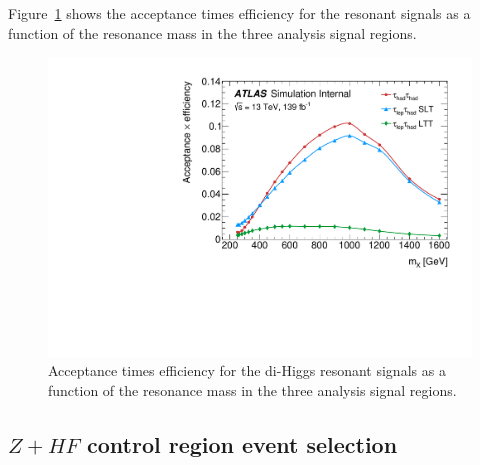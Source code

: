 Figure~\ref{fig:DiHiggsResSignalAcceptance} shows the acceptance times efficiency for the resonant signals as a function of the resonance mass in the three analysis signal regions.

\begin{figure}
\centering
\includegraphics[width=.75\textwidth]{figures/selection/AcceptanceEfficinecy_ATLASInternal_lin_smooth}
\caption{Acceptance times efficiency for the di-Higgs resonant signals as a function of the resonance mass in the three analysis signal regions.}
\label{fig:DiHiggsResSignalAcceptance}
\end{figure}



\FloatBarrier


%
%
%
%
%
%

\subsection{$Z+HF$ control region event selection}
\label{subsec:selhh_ZHFCR}

